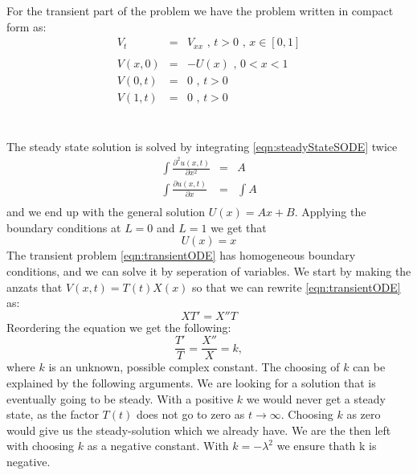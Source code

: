 \documentclass{article}
\begin{document}
For the transient part of the problem we have the problem written in compact form as:
\begin{subequations}
\begin{eqnarray}
\label{eqn:transientODE}
V_t &=& V_{xx} \textit{ , } t>0 \textit{ , } x \in [0,1] \\ \nonumber
\\
\label{eqn:transientIC}
V(x,0) &=& -U(x) \textit{ , } 0<x<1 \\
V(0,t) &=& 0 \textit{ , } t>0 \\
V(1,t) &=& 0 \textit{ , } t>0
\end{eqnarray}
\end{subequations}
\\
\\
The steady state solution is solved by integrating \ref{eqn:steadyStateSODE} twice
\begin{eqnarray}
\nonumber
\int \frac{\partial^2 u(x,t)}{\partial x^2} &=& A \\ \nonumber
\int \frac{\partial u(x,t)}{\partial x} &=& \int A \\ \nonumber
\end{eqnarray}
and we end up with the general solution $U(x) = Ax + B$. Applying the boundary conditions at $L=0$ and $L=1$ we get that 
\begin{equation}
U(x) = x
\label{eqn:UsteadyState1D}
\end{equation}
The transient problem \ref{eqn:transientODE} has homogeneous boundary conditions, and we can solve it by seperation of variables. We start by making the anzats that $V(x,t) = T(t)X(x)$ so that we can rewrite \ref{eqn:transientODE} as:
\begin{equation}
XT'=X''T 
\end{equation}
Reordering the equation we get the following:
\begin{equation}
\frac{T'}{T} = \frac{X''}{X} = k,
\end{equation}
where $k$ is an unknown, possible complex constant. The choosing of $k$ can be explained by the following arguments. We are looking for a solution that is eventually going to be steady. With a positive $k$ we would never get a steady state, as the factor $T(t)$ does not go to zero as $t \rightarrow \infty$. Choosing $k$ as zero would give us the steady-solution which we already have. We are the then left with choosing $k$ as a negative constant. With $k=-\lambda^2$ we ensure thath k is negative.\\
\\
\end{document}
